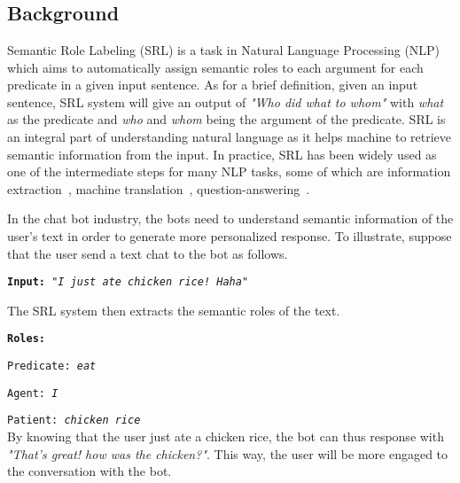 \chapter{\babSatu}


\section{Background}
	
Semantic Role Labeling (SRL) is a task in Natural Language Processing (NLP) which aims to automatically assign semantic roles to each argument for each predicate in a given input sentence. As for a brief definition, given an input sentence, SRL system will give an output of \textit{"Who did what to whom"} with \textit{what} as the predicate and \textit{who} and \textit{whom} being the argument of the predicate. SRL is an integral part of understanding natural language as it helps machine to retrieve semantic information from the input. In practice, SRL has been widely used as one of the intermediate steps for many NLP tasks, some of which are information extraction~\cite{emanuele2013textual, surdeanu2003using}, machine translation~\cite{liu2010semantic, lo2013improving}, question-answering~\cite{shen2007using, moschitti2003open}.

In the chat bot industry, the bots need to understand semantic information of the user's text in order to generate more personalized response. To illustrate, suppose that the user send a text chat to the bot as follows.

\texttt{\textbf{Input:} \textit{"I just ate chicken rice! Haha"}}

The SRL system then extracts the semantic roles of the text.

\texttt{\textbf{Roles:}}

\texttt{Predicate: \textit{eat}}

\texttt{Agent: \textit{I}}

\texttt{Patient: \textit{chicken rice}}
\\

By knowing that the user just ate a chicken rice, the bot can thus response with \textit{"That's great! how was the chicken?"}. This way, the user will be more engaged to the conversation with the bot.

